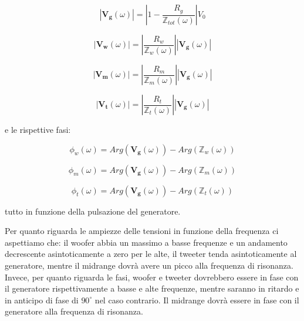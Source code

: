 \documentclass[12pt,italian]{article}
\begin{document}
\begin{equation}
	\left| \mathbf{V_{g}}(\omega) \right| = \left| 1 - \frac{R_g}
	{\mathbb{Z}_{tot}(\omega)}\right| V_{0}
	\label{eq:Vg}
\end{equation}

\begin{equation}
	\left| \mathbf{V_{w}}(\omega) \right| = \left| \frac{R_{w}}
	{\mathbb{Z}_{w}(\omega)}\right|\left| \mathbf{V_{g}}(\omega) \right|
	\label{eq:Vw}
\end{equation}

\begin{equation}
	\left| \mathbf{V_{m}}(\omega) \right| = \left| \frac{R_{m}}
	{\mathbb{Z}_{m}(\omega)}\right|\left| \mathbf{V_{g}}(\omega) \right|
	\label{eq:Vm}
\end{equation}

\begin{equation}
	\left| \mathbf{V_{t}}(\omega) \right| = \left| \frac{R_{t}}
	{\mathbb{Z}_{t}(\omega)}\right|\left| \mathbf{V_{g}}(\omega) \right|
	\label{eq:Vt}
\end{equation}

\noindent
e le rispettive fasi:

\begin{equation}
	\phi_{w}(\omega) = Arg(\mathbf{V_{g}}(\omega)) - Arg(\mathbb{Z}_{w}(\omega))
\end{equation}

\begin{equation}
	\phi_{m}(\omega) = Arg(\mathbf{V_{g}}(\omega)) - Arg(\mathbb{Z}_{m}(\omega))
\end{equation}

\begin{equation}
	\phi_{t}(\omega) =  Arg(\mathbf{V_{g}}(\omega)) - Arg(\mathbb{Z}_{t}(\omega))
\end{equation}

\noindent
tutto in funzione della pulsazione del generatore.

Per quanto riguarda le ampiezze delle tensioni in funzione della frequenza ci
aspettiamo che: il woofer abbia un massimo a basse frequenze e un andamento
decrescente asintoticamente a zero per le alte, il tweeter tenda
asintoticamente al generatore, mentre il midrange dovrà avere un picco alla
frequenza di risonanza. Invece, per quanto riguarda le fasi, woofer e tweeter
dovrebbero essere in fase con il generatore rispettivamente a basse e alte
frequenze, mentre saranno in ritardo e in anticipo di fase di $90^\circ$ nel
caso contrario. Il midrange dovrà essere in fase con il generatore alla
frequenza di risonanza.
\end{document}
